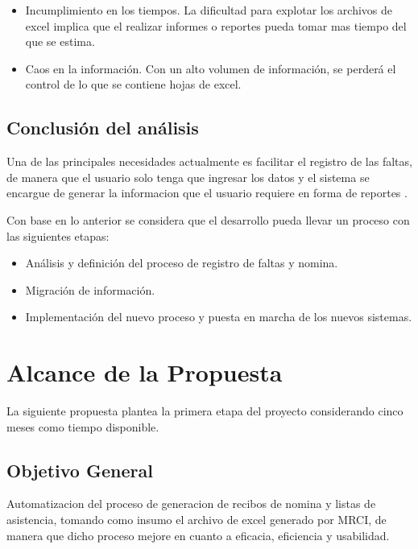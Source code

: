 \documentclass[10pt]{book}
\newcommand{\cliente}{MRCI}
\begin{document}
\begin{itemize}	
	\item Incumplimiento en los tiempos. La dificultad para explotar los archivos de excel implica que el realizar informes o reportes pueda tomar mas tiempo del que se estima.
	\item Caos en la información. Con un alto volumen de información, se perderá el control de lo que se contiene hojas de excel.
\end{itemize}


\section{Conclusión del análisis}
	
	Una de las principales necesidades actualmente es facilitar el registro de las faltas, de manera que el usuario solo tenga que ingresar los datos y el sistema se encargue de generar la informacion que el usuario requiere en forma de reportes .
		
	Con base en lo anterior se considera que el desarrollo pueda llevar un proceso con las siguientes etapas:
	
\begin{itemize}
	\item Análisis y definición del proceso de registro de faltas y nomina.
	\item Migración de información.
	\item Implementación del nuevo proceso y puesta en marcha de los nuevos sistemas.
\end{itemize}

\chapter{Alcance de la Propuesta}

	La siguiente propuesta plantea la primera etapa del proyecto considerando cinco meses como tiempo disponible.

\section{Objetivo General}

	Automatizacion del proceso de generacion de recibos de nomina y listas de asistencia, tomando como insumo el archivo de excel generado por \cliente, de manera que dicho proceso mejore en cuanto a eficacia, eficiencia y usabilidad.
	
\end{document}

